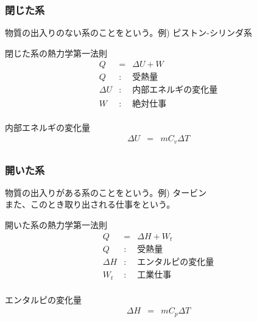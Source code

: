 \documentclass[a4paper]{jsarticle}
\begin{document}
\subsubsection{閉じた系}
物質の出入りのない系のことをという。\quad 例) ピストン-シリンダ系
\begin{itembox}[l]{閉じた系の熱力学第一法則}
    \begin{eqnarray*}
        Q&=&\Delta U+W\\
        Q&:&受熱量\\
        \Delta U&:&内部エネルギの変化量\\
        W&:&絶対仕事\\
    \end{eqnarray*}
\end{itembox}
\begin{itembox}[l]{内部エネルギの変化量}
    \begin{eqnarray*}
        \Delta U&=&mC_v\Delta T\\
    \end{eqnarray*}
\end{itembox}
\subsubsection{開いた系}
物質の出入りがある系のことをという。\quad 例) タービン\\
また、このとき取り出される仕事をという。
\begin{itembox}[l]{開いた系の熱力学第一法則}
    \begin{eqnarray*}
        Q&=&\Delta H+W_t\\
        Q&:&受熱量\\
        \Delta H&:&エンタルピの変化量\\
        W_t&:&工業仕事\\
    \end{eqnarray*}
\end{itembox}
\begin{itembox}[l]{エンタルピの変化量}
    \begin{eqnarray*}
        \Delta H&=&mC_p\Delta T\\
    \end{eqnarray*}
\end{itembox}
\end{document}
